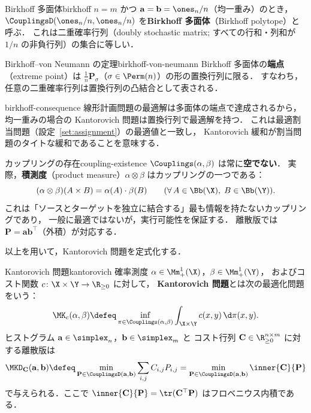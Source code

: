 \begin{definition}{Birkhoff 多面体}{birkhoff}
  $n = m$ かつ $\mathbf{a} = \mathbf{b} = \ones_n / n$（均一重み）のとき，
  $\CouplingsD(\ones_n/n, \ones_n/n)$ を\textbf{Birkhoff 多面体}（Birkhoff polytope）と呼ぶ．
  これは二重確率行列（doubly stochastic matrix;
  すべての行和・列和が $1/n$ の非負行列）の集合に等しい．
\end{definition}

\begin{theorem}{Birkhoff--von Neumann の定理}{birkhoff-von-neumann}
  Birkhoff 多面体の\textbf{端点}（extreme point）は
  $\frac{1}{n}\mathbf{P}_\sigma$（$\sigma \in \Perm(n)$）の形の置換行列に限る．
  すなわち，任意の二重確率行列は置換行列の凸結合として表される．
\end{theorem}

\begin{remark}{}{birkhoff-consequence}
  線形計画問題の最適解は多面体の端点で達成されるから，
  均一重みの場合の Kantorovich 問題は置換行列で最適解を持つ．
  これは最適割当問題（設定~\ref{set:assignment}）の最適値と一致し，
  Kantorovich 緩和が割当問題のタイトな緩和であることを意味する．
\end{remark}

\begin{remark}{カップリングの存在}{coupling-existence}
  $\Couplings(\alpha, \beta)$ は常に\textbf{空でない}．
  実際，\textbf{積測度}（product measure）$\alpha \otimes \beta$ はカップリングの一つである：
  \[
    (\alpha \otimes \beta)(A \times B) = \alpha(A) \cdot \beta(B)
    \qquad (\forall\, A \in \Bb(\X), \; B \in \Bb(\Y)).
  \]
  これは「ソースとターゲットを独立に結合する」最も情報を持たないカップリングであり，
  一般に最適ではないが，実行可能性を保証する．
  離散版では $\mathbf{P} = \mathbf{a} \mathbf{b}^\top$（外積）が対応する．
\end{remark}

以上を用いて，Kantorovich 問題を定式化する．

\begin{setting}{Kantorovich 問題}{kantorovich}
  確率測度 $\alpha \in \Mm_+^1(\X)$，$\beta \in \Mm_+^1(\Y)$，
  およびコスト関数 $c \colon \X \times \Y \to \R_{\geq 0}$ に対して，
  \textbf{Kantorovich 問題}とは次の最適化問題をいう：
  \[
    \MK_c(\alpha, \beta) \defeq
    \inf_{\pi \in \Couplings(\alpha, \beta)}
    \int_{\X \times \Y} c(x, y) \, \d\pi(x, y).
  \]
  ヒストグラム $\mathbf{a} \in \simplex_n$，$\mathbf{b} \in \simplex_m$ と
  コスト行列 $\mathbf{C} \in \R_{\geq 0}^{n \times m}$ に対する離散版は
  \[
    \MKD_{\mathbf{C}}(\mathbf{a}, \mathbf{b}) \defeq
    \min_{\mathbf{P} \in \CouplingsD(\mathbf{a}, \mathbf{b})}
    \sum_{i,j} C_{i,j} P_{i,j}
    = \min_{\mathbf{P} \in \CouplingsD(\mathbf{a}, \mathbf{b})}
    \inner{\mathbf{C}}{\mathbf{P}}
  \]
  で与えられる．ここで $\inner{\mathbf{C}}{\mathbf{P}} = \tr(\mathbf{C}^\top \mathbf{P})$
  はフロベニウス内積である．
\end{setting}

